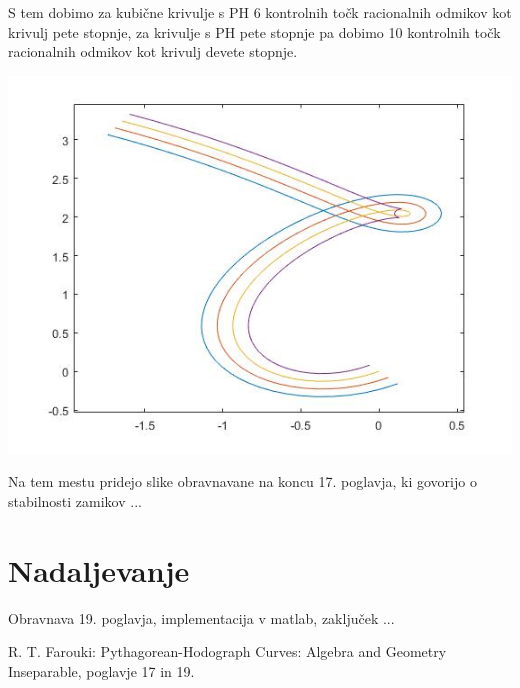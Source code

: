 \documentclass[a4paper]{article}
\begin{document}
	S tem dobimo za kubične krivulje s PH 6 kontrolnih točk racionalnih odmikov kot krivulj pete stopnje, za krivulje s PH pete stopnje pa dobimo 10 kontrolnih točk racionalnih odmikov kot krivulj devete stopnje.
	
	\centering
	\includegraphics[width=\linewidth]{odmik.jpg} 
	\label{fig:odmik}
	
	
	
	
	
	
	\vspace{90pt}
	Na tem mestu pridejo slike obravnavane na koncu 17. poglavja, ki govorijo o stabilnosti zamikov ...
	
	\section{Nadaljevanje}
	Obravnava 19. poglavja, implementacija v matlab, zaključek ...
	
	\begin{thebibliography}{1}
		 R. T. Farouki: Pythagorean-Hodograph Curves: Algebra and Geometry Inseparable, poglavje 17 in 19.
	\end{thebibliography}
\end{document}
